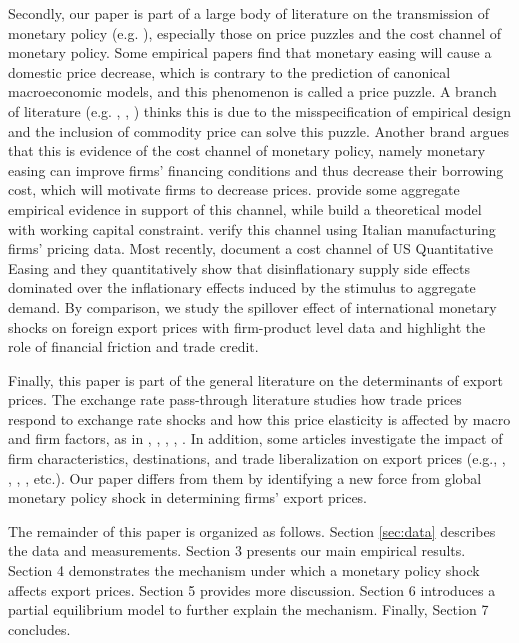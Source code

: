 Secondly, our paper is part of a large body of literature on the transmission of monetary policy (e.g. \cite{miranda2020us}), especially those on price puzzles and the cost channel of monetary policy. Some empirical papers find that monetary easing will cause a domestic price decrease, which is contrary to the prediction of canonical macroeconomic models, and this phenomenon is called a price puzzle. A branch of literature (e.g. \cite{sims1992interpreting}, \cite{christiano1994effects}, \cite{bernanke1998measuring}) thinks this is due to the misspecification of empirical design and the inclusion of commodity price can solve this puzzle. Another brand argues that this is evidence of the cost channel of monetary policy, namely monetary easing can improve firms’ financing conditions and thus decrease their borrowing cost, which will motivate firms to decrease prices.  \cite{barth2002federal} provide some aggregate empirical evidence in support of this channel, while \cite{ravenna2006optimal} build a theoretical model with working capital constraint. \cite{gaiotti2006there} verify this channel using Italian manufacturing firms’ pricing data. Most recently, \cite{boehl2022structural} document a cost channel of US Quantitative Easing and they quantitatively show that disinflationary supply side effects dominated over the inflationary effects induced by the stimulus to aggregate demand. By comparison, we study the spillover effect of international monetary shocks on foreign export prices with firm-product level data and highlight the role of financial friction and trade credit.


Finally, this paper is part of the general literature on the determinants of export prices. The exchange rate pass-through literature studies how trade prices respond to exchange rate shocks and how this price elasticity is affected by macro and firm factors, as in \cite{obstfeld2000six}, \cite{amiti2014importers}, \cite{li2015exchange}, \cite{devereux2017importers}, \cite{auer2018quality}. In addition, some articles investigate the impact of firm characteristics, destinations, and trade liberalization on export prices (e.g., \cite{manova2012export}, \cite{fan2015credit}, \cite{harrigan2015export}, \cite{fan2015trade}, etc.). Our paper differs from them by identifying a new force from global monetary policy shock in determining firms' export prices.



The remainder of this paper is organized as follows. Section \ref{sec:data} describes the data and measurements. Section 3 presents our main empirical results. Section 4 demonstrates the mechanism under which a monetary policy shock affects export prices. Section 5 provides more discussion. Section 6 introduces a partial equilibrium model to further explain the mechanism. Finally, Section 7 concludes.


